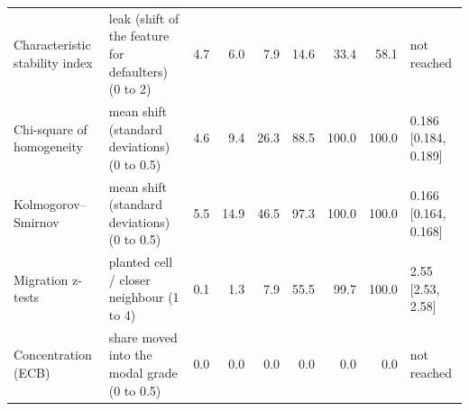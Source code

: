 {\begin{landscape}
\begin{table}[htbp]
{\begin{tabular}{llrrrrrrl}
Characteristic stability index & leak (shift of the feature for defaulters) (0 to 2) & 4.7 & 6.0 & 7.9 & 14.6 & 33.4 & 58.1 & not reached \\
Chi-square of homogeneity & mean shift (standard deviations) (0 to 0.5) & 4.6 & 9.4 & 26.3 & 88.5 & 100.0 & 100.0 & 0.186 [0.184, 0.189] \\
Kolmogorov--Smirnov & mean shift (standard deviations) (0 to 0.5) & 5.5 & 14.9 & 46.5 & 97.3 & 100.0 & 100.0 & 0.166 [0.164, 0.168] \\
Migration z-tests & planted cell / closer neighbour (1 to 4) & 0.1 & 1.3 & 7.9 & 55.5 & 99.7 & 100.0 & 2.55 [2.53, 2.58] \\
Concentration (ECB) & share moved into the modal grade (0 to 0.5) & 0.0 & 0.0 & 0.0 & 0.0 & 0.0 & 0.0 & not reached \\
\bottomrule
\end{tabular}}
\end{table}
\end{landscape}}
